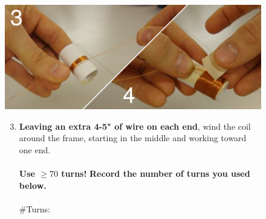 \documentclass[11pt]{article}
\begin{document}
\begin{figure}[H]
	\begin{minipage}[b]{0.69\linewidth}
		\centering	\includegraphics[width=\textwidth]{images/wind_coil.pdf}
		\vspace{1.2cm}
	\end{minipage}
	\hspace{0.1cm}
	\begin{minipage}[b]{0.3\linewidth}
		\begin{enumerate} \setcounter{enumi}{2}
			\item {\bf Leaving an extra 4-5" of wire on each end}, wind the coil around the frame, starting in the middle and working 					toward one end.  \\ \\
				{\bf Use $\geq 70$ turns!}
				{\bf Record the number of turns you used below.} \\ \\ 
				$\#$Turns: \hrulefill
		\end{enumerate}
	\end{minipage}
\end{figure}

\vspace{0.5cm}
\end{document}
